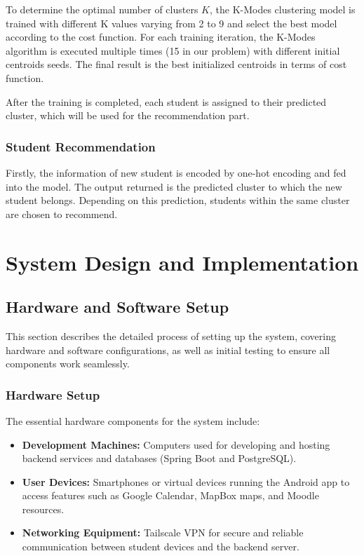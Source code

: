 \documentclass[12pt]{article}
\begin{document}
To determine the optimal number of clusters $K$, the K-Modes clustering model is trained with different K values varying from 2 to 9 and select the best model according to the cost function. For each training iteration, the K-Modes algorithm is executed multiple times (15 in our problem) with different initial centroids seeds. The final result is the best initialized centroids in terms of cost function.\citep{devos2015}

After the training is completed, each student is assigned to their predicted cluster, which will be used for the recommendation part.

\subsubsection{Student Recommendation}
Firstly, the information of new student is encoded by one-hot encoding and fed into the model. The output returned is the predicted cluster to which the new student belongs. Depending on this prediction, students within the same cluster are chosen to recommend.

\pagebreak

\section{System Design and Implementation}  

\subsection{Hardware and Software Setup}  
This section describes the detailed process of setting up the system, covering hardware and software configurations, as well as initial testing to ensure all components work seamlessly.

\subsubsection{Hardware Setup}  
The essential hardware components for the system include:  
\begin{itemize}  
    \item \textbf{Development Machines: }Computers used for developing and hosting backend services and databases (Spring Boot and PostgreSQL).  
    \item \textbf{User Devices: }Smartphones or virtual devices running the Android app to access features such as Google Calendar, MapBox maps, and Moodle resources.  
    \item \textbf{Networking Equipment: }Tailscale VPN for secure and reliable communication between student devices and the backend server.  
\end{itemize}
\end{document}
